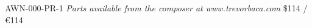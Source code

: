 \documentclass{article}
\begin{document}
\null \vfill

AWN-000-PR-1 \hfill
\textit{Parts available from the composer at www.trevorbaca.com}
\hfill \$114 / \euro 114
\end{document}
